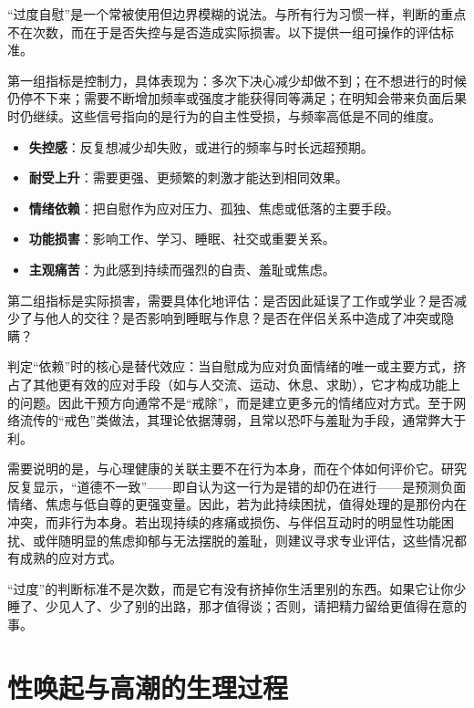 \documentclass[12pt,UTF8]{ctexbook}
\begin{document}
“过度自慰”是一个常被使用但边界模糊的说法。与所有行为习惯一样，判断的重点不在次数，而在于是否失控与是否造成实际损害。以下提供一组可操作的评估标准。

第一组指标是控制力，具体表现为：多次下决心减少却做不到；在不想进行的时候仍停不下来；需要不断增加频率或强度才能获得同等满足；在明知会带来负面后果时仍继续。这些信号指向的是行为的自主性受损，与频率高低是不同的维度。

\begin{itemize}
\item \textbf{失控感}：反复想减少却失败，或进行的频率与时长远超预期。
\item \textbf{耐受上升}：需要更强、更频繁的刺激才能达到相同效果。
\item \textbf{情绪依赖}：把自慰作为应对压力、孤独、焦虑或低落的主要手段。
\item \textbf{功能损害}：影响工作、学习、睡眠、社交或重要关系。
\item \textbf{主观痛苦}：为此感到持续而强烈的自责、羞耻或焦虑。
\end{itemize}

第二组指标是实际损害，需要具体化地评估：是否因此延误了工作或学业？是否减少了与他人的交往？是否影响到睡眠与作息？是否在伴侣关系中造成了冲突或隐瞒？

判定“依赖”时的核心是替代效应：当自慰成为应对负面情绪的唯一或主要方式，挤占了其他更有效的应对手段（如与人交流、运动、休息、求助），它才构成功能上的问题。因此干预方向通常不是“戒除”，而是建立更多元的情绪应对方式。至于网络流传的“戒色”类做法，其理论依据薄弱，且常以恐吓与羞耻为手段，通常弊大于利。

需要说明的是，与心理健康的关联主要不在行为本身，而在个体如何评价它。研究反复显示，“道德不一致”——即自认为这一行为是错的却仍在进行——是预测负面情绪、焦虑与低自尊的更强变量。因此，若为此持续困扰，值得处理的是那份内在冲突，而非行为本身。若出现持续的疼痛或损伤、与伴侣互动时的明显性功能困扰、或伴随明显的焦虑抑郁与无法摆脱的羞耻，则建议寻求专业评估，这些情况都有成熟的应对方式。

\begin{tcolorbox}[colback=pink!5!white,colframe=red!50!black,title=贴心小叮咛]
“过度”的判断标准不是次数，而是它有没有挤掉你生活里别的东西。如果它让你少睡了、少见人了、少了别的出路，那才值得谈；否则，请把精力留给更值得在意的事。
\end{tcolorbox}

\section{性唤起与高潮的生理过程}
\end{document}
